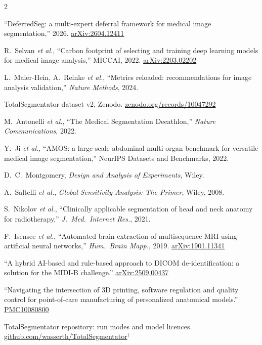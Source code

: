 \documentclass[10pt,a4paper]{article}
\newcommand{\pv}{$^\dagger$}
\begin{document}
\begin{multicols}{2}
\begin{enumerate}[label={[\arabic*]},leftmargin=*,itemsep=0.5pt,topsep=0pt,parsep=0pt]
\item\label{r:deferredseg} ``DeferredSeg: a multi-expert deferral framework for medical image segmentation,'' 2026. \href{https://arxiv.org/abs/2604.12411}{arXiv:2604.12411}
\item\label{r:selvan} R.~Selvan \emph{et al.}, ``Carbon footprint of selecting and training deep learning models for medical image analysis,'' MICCAI, 2022. \href{https://arxiv.org/abs/2203.02202}{arXiv:2203.02202}
\item\label{r:mr} L.~Maier-Hein, A.~Reinke \emph{et al.}, ``Metrics reloaded: recommendations for image analysis validation,'' \emph{Nature Methods}, 2024.
\item\label{r:tsdata} TotalSegmentator dataset v2, Zenodo. \href{https://zenodo.org/records/10047292}{zenodo.org/records/10047292}
\item\label{r:msd} M.~Antonelli \emph{et al.}, ``The Medical Segmentation Decathlon,'' \emph{Nature Communications}, 2022.
\item\label{r:amos} Y.~Ji \emph{et al.}, ``AMOS: a large-scale abdominal multi-organ benchmark for versatile medical image segmentation,'' NeurIPS Datasets and Benchmarks, 2022.
\item\label{r:montgomery} D.~C.~Montgomery, \emph{Design and Analysis of Experiments}, Wiley.
\item\label{r:saltelli} A.~Saltelli \emph{et al.}, \emph{Global Sensitivity Analysis: The Primer}, Wiley, 2008.
\item\label{r:nikolov} S.~Nikolov \emph{et al.}, ``Clinically applicable segmentation of head and neck anatomy for radiotherapy,'' \emph{J.\ Med.\ Internet Res.}, 2021.
\item\label{r:hdbet} F.~Isensee \emph{et al.}, ``Automated brain extraction of multisequence MRI using artificial neural networks,'' \emph{Hum.\ Brain Mapp.}, 2019. \href{https://arxiv.org/abs/1901.11341}{arXiv:1901.11341}
\item\label{r:midib} ``A hybrid AI-based and rule-based approach to DICOM de-identification: a solution for the MIDI-B challenge.'' \href{https://arxiv.org/abs/2509.00437}{arXiv:2509.00437}
\item\label{r:pocreg} ``Navigating the intersection of 3D printing, software regulation and quality control for point-of-care manufacturing of personalized anatomical models.'' \href{https://pmc.ncbi.nlm.nih.gov/articles/PMC10080800/}{PMC10080800}
\item\label{r:tsrepo} TotalSegmentator repository: run modes and model licences. \href{https://github.com/wasserth/TotalSegmentator}{github.com/wasserth/TotalSegmentator}\pv

\end{enumerate}
\end{multicols}
\end{document}
